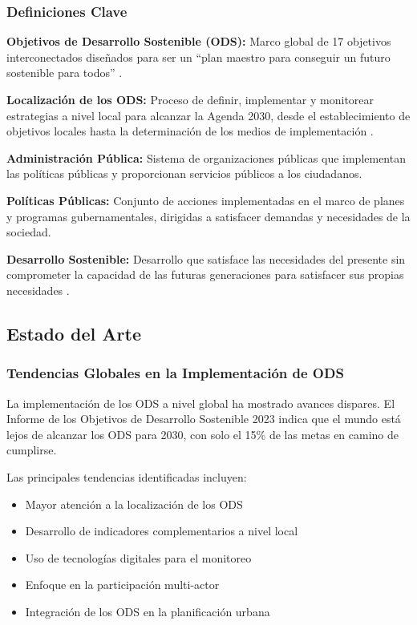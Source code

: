 \subsubsection{Definiciones Clave}

\textbf{Objetivos de Desarrollo Sostenible (ODS):} Marco global de 17 objetivos interconectados diseñados para ser un ``plan maestro para conseguir un futuro sostenible para todos'' \citep{naciones_unidas_2015}.

\textbf{Localización de los ODS:} Proceso de definir, implementar y monitorear estrategias a nivel local para alcanzar la Agenda 2030, desde el establecimiento de objetivos locales hasta la determinación de los medios de implementación \citep{cglu_2018}.

\textbf{Administración Pública:} Sistema de organizaciones públicas que implementan las políticas públicas y proporcionan servicios públicos a los ciudadanos.

\textbf{Políticas Públicas:} Conjunto de acciones implementadas en el marco de planes y programas gubernamentales, dirigidas a satisfacer demandas y necesidades de la sociedad.

\textbf{Desarrollo Sostenible:} Desarrollo que satisface las necesidades del presente sin comprometer la capacidad de las futuras generaciones para satisfacer sus propias necesidades \citep{brundtland_1987}.

\subsection{Estado del Arte}

\subsubsection{Tendencias Globales en la Implementación de ODS}

La implementación de los ODS a nivel global ha mostrado avances dispares. El Informe de los Objetivos de Desarrollo Sostenible 2023 \citep{naciones_unidas_2023} indica que el mundo está lejos de alcanzar los ODS para 2030, con solo el 15\% de las metas en camino de cumplirse.

Las principales tendencias identificadas incluyen:

\begin{itemize}
    \item Mayor atención a la localización de los ODS
    \item Desarrollo de indicadores complementarios a nivel local
    \item Uso de tecnologías digitales para el monitoreo
    \item Enfoque en la participación multi-actor
    \item Integración de los ODS en la planificación urbana
\end{itemize}

